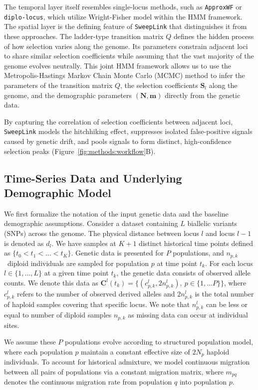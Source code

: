 \documentclass{article}
\newcommand{\SweepLink}{\texttt{SweepLink}\xspace}
\newcommand{\ApproxWF}{\texttt{ApproxWF}\xspace}
\newcommand{\diplolocus}{\texttt{diplo-locus}\xspace}
\begin{document}
The temporal layer itself resembles single-locus methods, such as \ApproxWF or \linebreak \diplolocus, which utilize Wright-Fisher model within the HMM framework.
The spatial layer is the defining feature of \SweepLink that distinguishes it from these approaches.
The ladder-type transition matrix $Q$ defines the hidden process of how selection varies along the genome.
Its parameters constrain adjacent loci to share similar selection coefficients while assuming that the vast majority of the genome evolves neutrally.
This joint HMM framework allows us to use the Metropolis-Hastings Markov Chain Monte Carlo (MCMC) method to infer the parameters of the transition matrix $Q$, the selection coefficients $\mathbf{S}_l$ along the genome, and the demographic parameters $(\mathbf{N}, \mathbf{m})$ directly from the genetic data.

By capturing the correlation of selection coefficients between adjacent loci, \SweepLink models the hitchhiking effect, suppresses isolated false-positive signals caused by genetic drift, and pools signals to form distinct, high-confidence selection peaks (Figure~\ref{fig:methods:workflow}B).

\subsection{Time-Series Data and Underlying Demographic Model}

We first formalize the notation of the input genetic data and the baseline demographic assumptions.
Consider a dataset containing $L$ biallelic variants (SNPs) across the genome.
The physical distance between locus $l$ and locus $l-1$ is denoted as $d_l$.
We have samples at $K + 1$ distinct historical time points defined as $\{t_0 < t_1 < \ldots < t_K\}$.
Genetic data is presented for $P$ populations, and $n_{p, k}$~diploid individuals are sampled for population $p$ at time point $t_k$.
For each locus $l \in \{1, \dots, L\}$ at a given time point $t_k$, the genetic data consists of observed allele counts.
We denote this data as $\mathbf{C}^l(t_k) = \{(c^l_{p,k}, 2n^l_{p,k}),\ p \in \{1, \dots P\}\}$, where $c^l_{p,k}$ refers to the number of observed derived alleles and $2n^l_{p,k}$ is the total number of haploid samples covering that specific locus.
We note that $n^l_{p,k}$ can be less or equal to number of diploid samples $n_{p,k}$ as missing data can occur at individual sites.

We assume these $P$ populations evolve according to structured population model, where each population $p$ maintain a constant effective size of $2N_p$ haploid individuals.
To account for historical admixture, we model continuous migration between all pairs of populations via a constant migration matrix, where $m_{pq}$ denotes the continuous migration rate from population $q$ into population $p$.
\end{document}
